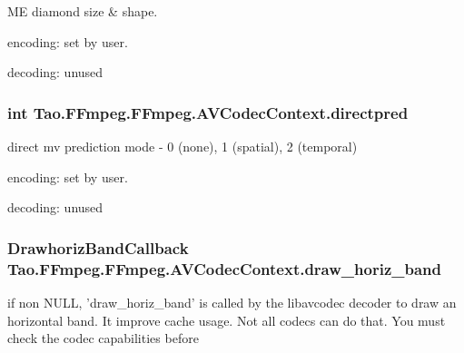 \label{struct_tao_1_1_f_fmpeg_1_1_f_fmpeg_1_1_a_v_codec_context_ac1e7fe9512c33818fadd9d52e801f224}
ME diamond size \& shape.
\begin{DoxyItemize}
\item encoding: set by user.
\item decoding: unused 
\end{DoxyItemize}\hypertarget{struct_tao_1_1_f_fmpeg_1_1_f_fmpeg_1_1_a_v_codec_context_a8c7f3729d8ec506b0291c54c0d1b0649}{
\subsubsection[{directpred}]{\setlength{\rightskip}{0pt plus 5cm}int {\bf Tao.FFmpeg.FFmpeg.AVCodecContext.directpred}}}
\label{struct_tao_1_1_f_fmpeg_1_1_f_fmpeg_1_1_a_v_codec_context_a8c7f3729d8ec506b0291c54c0d1b0649}
direct mv prediction mode -\/ 0 (none), 1 (spatial), 2 (temporal)
\begin{DoxyItemize}
\item encoding: set by user.
\item decoding: unused 
\end{DoxyItemize}\hypertarget{struct_tao_1_1_f_fmpeg_1_1_f_fmpeg_1_1_a_v_codec_context_a70d93baee76e9e991d9700d10a1d9172}{
\subsubsection[{draw\_\-horiz\_\-band}]{\setlength{\rightskip}{0pt plus 5cm}DrawhorizBandCallback {\bf Tao.FFmpeg.FFmpeg.AVCodecContext.draw\_\-horiz\_\-band}}}
\label{struct_tao_1_1_f_fmpeg_1_1_f_fmpeg_1_1_a_v_codec_context_a70d93baee76e9e991d9700d10a1d9172}
if non NULL, 'draw\_\-horiz\_\-band' is called by the libavcodec decoder to draw an horizontal band. It improve cache usage. Not all codecs can do that. You must check the codec capabilities before

